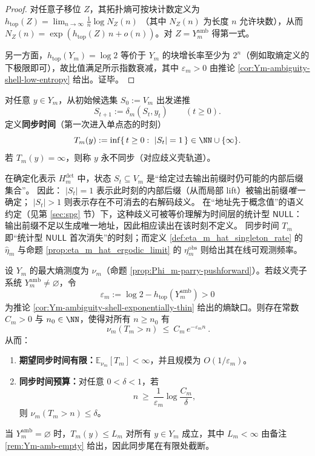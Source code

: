 \begin{proof}
对任意子移位 \(Z\)，其拓扑熵可按块计数定义为
\(
h_{\mathrm{top}}(Z)=\lim_{n\to\infty}\frac{1}{n}\log N_Z(n)
\)
（其中 \(N_Z(n)\) 为长度 \(n\) 允许块数），从而 \(N_Z(n)=\exp(h_{\mathrm{top}}(Z)\,n+o(n))\)。对 \(Z=Y_m^{\mathrm{amb}}\) 得第一式。
\par
另一方面，\(h_{\mathrm{top}}(Y_m)=\log 2\) 等价于 \(Y_m\) 的块增长率至少为 \(2^n\)（例如取熵定义的下极限即可），故比值满足所示指数衰减，其中 \(\varepsilon_m>0\) 由推论 \ref{cor:Ym-ambiguity-shell-low-entropy} 给出。证毕。
\end{proof}

\begin{definition}[同步时间与同步尾]\label{def:Ym-sync-time}
对任意 \(y\in Y_m\)，从初始候选集 \(S_0:=V_m\) 出发递推
\[
S_{t+1}:=\delta_m(S_t,y_t)\qquad (t\ge 0).
\]
定义\textbf{同步时间}（第一次进入单点态的时刻）
\[
T_m(y):=\inf\{\,t\ge 0:\ |S_t|=1\,\}\in\NN\cup\{\infty\}.
\]
若 \(T_m(y)=\infty\)，则称 \(y\) 永不同步（对应歧义壳轨道）。
\end{definition}

\begin{remark}\label{rem:Ym-stat-null-unsync}
在确定化表示 \(H_m^{\mathrm{det}}\) 中，状态 \(S_t\subseteq V_m\) 是“给定过去输出前缀时仍可能的内部后缀集合”。
因此：
\(|S_t|=1\) 表示此时刻的内部后缀（从而局部 lift）被输出前缀\emph{唯一}确定；
\(|S_t|>1\) 则表示存在不可消去的右解码歧义。
在“地址先于概念值”的语义约定（见第 \ref{sec:spg} 节）下，这种歧义可被等价理解为时间层的统计型 \(\mathsf{NULL}\)：输出前缀不足以生成唯一地址，因此相应读出在该时刻不定义。
同步时间 \(T_m\) 即“统计型 \(\mathsf{NULL}\) 首次消失”的时刻；而定义 \ref{def:eta_m_hat_singleton_rate} 的 \(\widehat\eta_m\) 与命题 \ref{prop:eta_m_hat_ergodic_limit} 的 \(\eta_m^{\mathrm{obs}}\) 则给出其在线可观测频率。
\end{remark}

\begin{theorem}\label{thm:Ym-sync-tail}
设 \(Y_m\) 的最大熵测度为 \(\nu_m\)（命题 \ref{prop:Phi_m-parry-pushforward}）。若歧义壳子系统 \(Y_m^{\mathrm{amb}}\neq\varnothing\)，令
\[
\varepsilon_m:=\log 2-h_{\mathrm{top}}(Y_m^{\mathrm{amb}})>0
\]
为推论 \ref{cor:Ym-ambiguity-shell-exponentially-thin} 给出的熵缺口。则存在常数 \(C_m>0\) 与 \(n_0\in\NN\)，使得对所有 \(n\ge n_0\) 有
\[
\boxed{\ \nu_m(T_m>n)\ \le\ C_m\,e^{-\varepsilon_m n}\ }.
\]
从而：
\begin{enumerate}
  \item \textbf{期望同步时间有限：}\(\mathbb{E}_{\nu_m}[T_m]<\infty\)，并且规模为 \(O(1/\varepsilon_m)\)。
  \item \textbf{同步时间预算：}对任意 \(0<\delta<1\)，若
  \[
  n\ \ge\ \frac{1}{\varepsilon_m}\log\frac{C_m}{\delta},
  \]
  则 \(\nu_m(T_m>n)\le \delta\)。
\end{enumerate}
当 \(Y_m^{\mathrm{amb}}=\varnothing\) 时，\(T_m(y)\le L_m\) 对所有 \(y\in Y_m\) 成立，其中 \(L_m<\infty\) 由备注 \ref{rem:Ym-amb-empty} 给出，因此同步尾在有限处截断。
\end{theorem}

